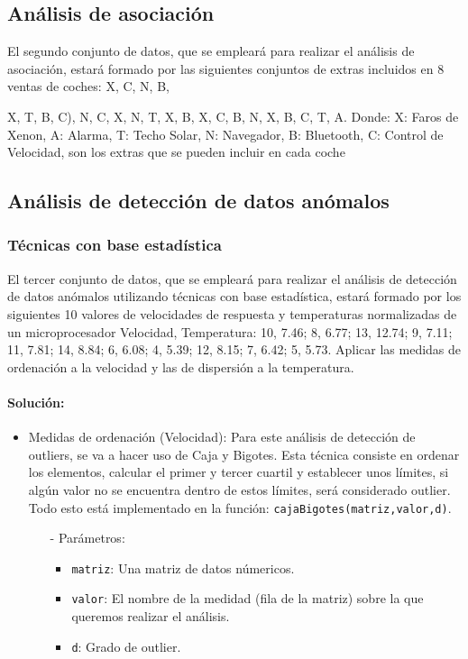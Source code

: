 \documentclass[a4paper, 12pt]{article}
\begin{document}
	\subsection{Análisis de asociación}
	El segundo conjunto de datos, que se empleará para realizar el análisis de asociación, estará formado por las siguientes conjuntos de extras incluidos en 8 ventas de coches: {X, C, N, B}, {X, T, B, C), {N, C, X}, {N, T, X, B}, {X, C, B}, {N}, {X, B, C}, {T, A}. Donde: {X: Faros de Xenon, A: Alarma, T: Techo Solar, N: Navegador, B: Bluetooth, C: Control de Velocidad}, son los extras que se pueden incluir en cada coche
		
	\subsection{Análisis de detección de datos anómalos}
		
		\subsubsection{Técnicas con base estadística}
		El tercer conjunto de datos, que se empleará para realizar el análisis de detección de datos anómalos utilizando técnicas con base estadística, estará formado por los siguientes 10 valores de velocidades de respuesta y temperaturas normalizadas de un microprocesador {Velocidad, Temperatura}: {10, 7.46; 8, 6.77; 13, 12.74; 9, 7.11; 11, 7.81; 14, 8.84; 6, 6.08; 4, 5.39; 12, 8.15; 7, 6.42; 5, 5.73}. Aplicar las medidas de ordenación a la velocidad y las de dispersión a la temperatura.
		
		\paragraph{Solución:}
		\begin{itemize}
			\item Medidas de ordenación (Velocidad): Para este análisis de detección de outliers, se va a hacer uso de Caja y Bigotes. Esta técnica consiste en ordenar los elementos, calcular el primer y tercer cuartil y establecer unos límites, si algún valor no se encuentra dentro de estos límites, será considerado outlier. \\ Todo esto está implementado en la función: \texttt{cajaBigotes(matriz,valor,d)}.
			\begin{itemize}
				\item[-] Parámetros:
				\begin{itemize}
					\item \texttt{matriz}: Una matriz de datos númericos.
					\item \texttt{valor}: El nombre de la medidad (fila de la matriz) sobre la que queremos realizar el análisis.
					\item \texttt{d}: Grado de outlier.
				\end{itemize}
				

\end{itemize}
\end{itemize}}
\end{document}

